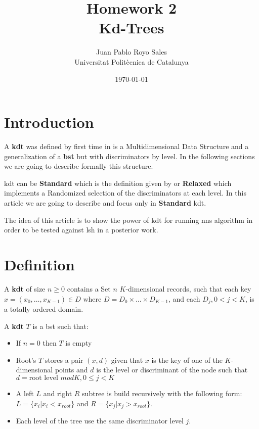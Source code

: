 \documentclass[12pt, a4paper]{article}
\title{%
      Homework 2 \\
      Kd-Trees
}
\author{%
  Juan Pablo Royo Sales\\
  \small{Universitat Politècnica de Catalunya}
}
\date\today
\begin{document}
\maketitle

\medskip

\section{Introduction}
A \textbf{\acrfull{kdt}} was defined by first time in \cite{bentley} is a Multidimensional Data Structure and a generalization of a \textbf{\acrfull{bst}} but with discriminators by level. In the following sections we are going to describe formally this structure.

\acrshort{kdt} can be \textbf{Standard} which is the definition given by \cite{bentley} or \textbf{Relaxed} which implements a Randomized selection of the discriminators at each level. In this article we are going to describe and focus only in \textbf{Standard} \acrshort{kdt}.

The idea of this article is to show the power of \acrshort{kdt} for running \acrfull{nns} algorithm in order to be tested against \acrfull{lsh} in a posterior work.

\section{Definition}
A \textbf{\acrshort{kdt}} of size $n \geq 0$ contains a Set $n$ $K$-dimensional records, such that each key $x = (x_0, \dots , x_{K-1}) \in D$ where  $D = D_0 \times \dots \times D_{K-1}$, and each $D_j, 0 < j < K$, is a totally ordered domain.

A \textbf{\acrshort{kdt}} $T$ is a \acrshort{bst} such that:

\begin{itemize}
    \item If $n = 0$ then $T$ is empty
    \item Root's $T$ stores a pair $(x,d)$ given that $x$ is the key of one of the $K$-dimensional points and $d$ is the level or discriminant of the node such that $ d = \text{root level } mod K, 0 \leq j < K$
    \item A left $L$ and right $R$ subtree is build recursively with the following form: $ L = \{ x_i | x_i < x_{root} \}$ and $R = \{x_j | x_j > x_{root}\}$.
    \item Each level of the tree use the same discriminator level $j$.
\end{itemize}

\medskip




\printglossaries
\end{document}
